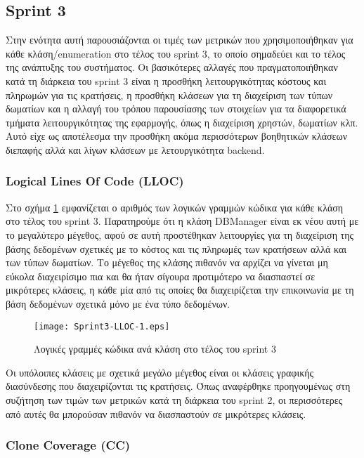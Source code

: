 \subsection{Sprint 3}

Στην ενότητα αυτή παρουσιάζονται οι τιμές των μετρικών που
χρησιμοποιήθηκαν για κάθε κλάση/enumeration στο τέλος του sprint 3, το
οποίο σημαδεύει και το τέλος της ανάπτυξης του συστήματος. Οι
βασικότερες αλλαγές που πραγματοποιήθηκαν κατά τη διάρκεια του sprint 3
είναι η προσθήκη λειτουργικότητας κόστους και πληρωμών για τις
κρατήσεις, η προσθήκη κλάσεων για τη διαχείριση των τύπων δωματίων
και η αλλαγή του τρόπου παρουσίασης των στοιχείων για τα διαφορετικά
τμήματα λειτουργικότητας της εφαρμογής, όπως η διαχείριση χρηστών,
δωματίων κλπ. Αυτό είχε ως αποτέλεσμα την προσθήκη ακόμα περισσότερων
βοηθητικών κλάσεων διεπαφής αλλά και λίγων κλάσεων με λετουργικότητα
backend.

\subsubsection{Logical Lines Of Code (LLOC)}
\label{section:sprint3LLOC}

Στο σχήμα \ref{fig:sprint3LLOC} εμφανίζεται ο αριθμός των λογικών
γραμμών κώδικα για κάθε κλάση στο τέλος του sprint 3. Παρατηρούμε ότι η
κλάση DBManager είναι εκ νέου αυτή με το μεγαλύτερο μέγεθος, αφού σε
αυτή προστέθηκαν λειτουργίες για τη διαχείριση της βάσης δεδομένων
σχετικές με το κόστος και τις πληρωμές των κρατήσεων αλλά και των τύπων
δωματίων. Το μέγεθος της κλάσης πιθανόν να αρχίζει να γίνεται μη
εύκολα διαχειρίσιμο πια και θα ήταν σίγουρα προτιμότερο να διασπαστεί σε
μικρότερες κλάσεις, η κάθε μία από τις οποίες θα διαχειρίζεται την
επικοινωνία με τη βάση δεδομένων σχετικά μόνο με ένα τύπο δεδομένων.

\begin{figure}
\centering
\texttt{[image: Sprint3-LLOC-1.eps]}
\caption{Λογικές γραμμές κώδικα ανά κλάση στο τέλος του sprint 3}
\label{fig:sprint3LLOC}
\end{figure}

Οι υπόλοιπες κλάσεις με σχετικά μεγάλο μέγεθος είναι οι κλάσεις γραφικής
διασύνδεσης που διαχειρίζονται τις κρατήσεις. Όπως αναφέρθηκε
προηγουμένως στη συζήτηση των τιμών των μετρικών κατά τη διάρκεια του
sprint 2, οι περισσότερες από αυτές θα μπορούσαν πιθανόν να διασπαστούν
σε μικρότερες κλάσεις.

\subsubsection{Clone Coverage (CC)}
\label{section:sprint3CC}

